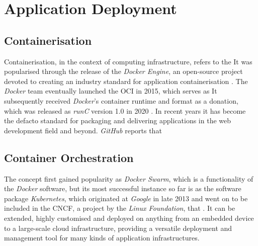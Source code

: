 \section{Application Deployment}

\subsection{Containerisation}

Containerisation, in the context of computing infrastructure, refers to the  It was popularised through the release of the \emph{Docker Engine}, an open-source project devoted to creating an industry standard for application containerisation \parencite{dockerRelease}. The \emph{Docker} team eventually launched the \ac{OCI} in 2015, which serves as  It subsequently received \emph{Docker}'s container runtime and format as a donation, which was released as \emph{runC} version 1.0 in 2020 \parencite{openContainerInitiative}. In recent years it has become the defacto standard for packaging and delivering applications in the web development field and beyond. \emph{GitHub} reports that 

\subsection{Container Orchestration}

 The concept first gained popularity as \emph{Docker Swarm}, which is a functionality of the \emph{Docker} software, but its most successful instance so far is as the software package \emph{Kubernetes}, which originated at \emph{Google} in late 2013 \parencite{kubernetesHistory} and went on to be included in the \ac{CNCF}, a project by the \emph{Linux Foundation}, that . It can be extended, highly customised and deployed on anything from an embedded device to a large-scale cloud infrastructure, providing a versatile deployment and management tool for many kinds of application infrastructures.
